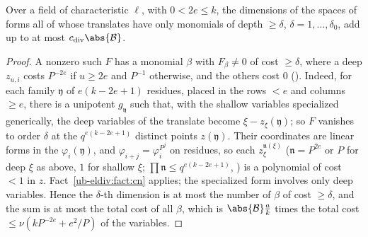 \begin{proposition}\label{ub-eldiv:prop:deep}
Over a field of characteristic $\ell$, with $0<2e\le k$, the dimensions of the spaces of forms all of
whose translates have only monomials of depth $\ge\delta$, $\delta=1,\dots,\delta_0$, add up to at
most $c_{\mathrm{div}}\abs{\mathcal B}$.
\end{proposition}

\begin{proof}
A nonzero such $F$ has a monomial $\beta$ with $F_\beta\ne0$ of cost $\ge\delta$, where a deep
$z_{u,i}$ costs $P^{-2e}$ if $u\ge2e$ and $P^{-1}$ otherwise, and the others cost $0$
(). Indeed, for each family $\mathfrak y$ of
$e(k-2e+1)$ residues, placed in the rows $<e$ and columns $\ge e$, there is a unipotent
$g_{\mathfrak y}$ such that, with the shallow variables specialized generically, the deep variables
of the translate become $\xi-z_\xi(\mathfrak y)$; so $F$ vanishes to order $\delta$ at the
$q^{e(k-2e+1)}$ distinct points $z(\mathfrak y)$. Their coordinates are linear forms in the
$\varphi_i(\mathfrak y)$, and $\varphi_{i+j}=\varphi_i^{P^j}$ on residues, so each
$z_\xi^{\mathfrak n(\xi)}$ ($\mathfrak n=P^{2e}$ or $P$ for deep $\xi$ as above, $1$ for shallow $\xi$;
$\prod\mathfrak n\le q^{e(k-2e+1)}$, ) is a polynomial of cost
$<1$ in $z$. Fact~\ref{ub-eldiv:fact:cn} applies; the specialized form involves only deep variables.
Hence the $\delta$-th dimension is at most the number of $\beta$ of cost $\ge\delta$, and the sum is
at most the total cost of all $\beta$, which is $\abs{\mathcal B}\frac ak$ times the total cost
$\le\nu(kP^{-2e}+e^2/P)$ of the variables.
\end{proof}
